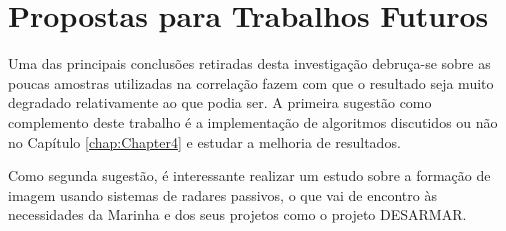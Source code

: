 \section{Propostas para Trabalhos Futuros}
Uma das principais conclusões retiradas desta investigação debruça-se sobre as poucas amostras utilizadas na correlação fazem com que o resultado seja muito degradado relativamente ao que podia ser. A primeira sugestão como complemento deste trabalho é a implementação de algoritmos discutidos ou não no Capítulo \ref{chap:Chapter4} e estudar a melhoria de resultados.\par 
Como segunda sugestão, é interessante realizar um estudo sobre a formação de imagem usando sistemas de radares passivos, o que vai de encontro às necessidades da Marinha e dos seus projetos como o projeto DESARMAR.